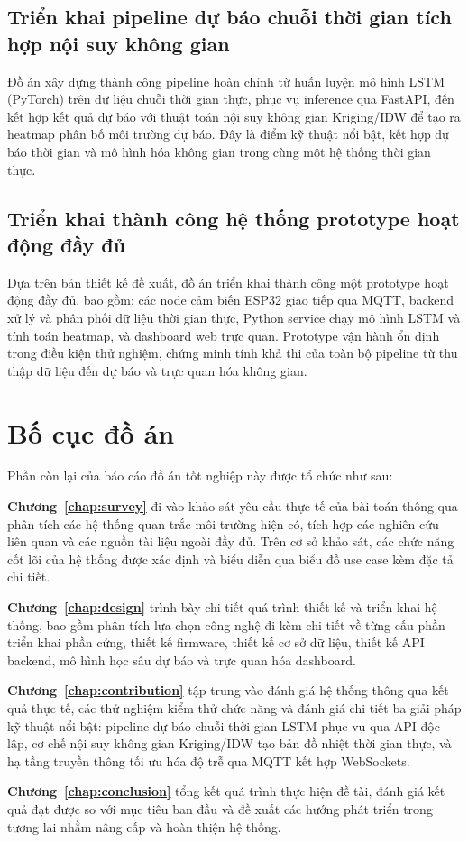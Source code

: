 \subsection{Triển khai pipeline dự báo chuỗi thời gian tích hợp
nội suy không gian}
\label{subsec:intro:contrib2}

Đồ án xây dựng thành công pipeline hoàn chỉnh từ huấn luyện mô hình
LSTM (PyTorch) trên dữ liệu chuỗi thời gian thực, phục vụ inference
qua FastAPI, đến kết hợp kết quả dự báo với thuật toán nội suy không
gian Kriging/IDW để tạo ra heatmap phân bố môi trường dự báo. Đây là
điểm kỹ thuật nổi bật, kết hợp dự báo thời gian và mô hình hóa không
gian trong cùng một hệ thống thời gian thực.

\subsection{Triển khai thành công hệ thống prototype hoạt động đầy đủ}
\label{subsec:intro:contrib3}

Dựa trên bản thiết kế đề xuất, đồ án triển khai thành công một prototype
hoạt động đầy đủ, bao gồm: các node cảm biến ESP32 giao tiếp qua MQTT,
backend xử lý và phân phối dữ liệu thời gian thực, Python service chạy
mô hình LSTM và tính toán heatmap, và dashboard web trực quan. Prototype
vận hành ổn định trong điều kiện thử nghiệm, chứng minh tính khả thi
của toàn bộ pipeline từ thu thập dữ liệu đến dự báo và trực quan hóa
không gian.

\section{Bố cục đồ án}
\label{sec:intro:structure}

Phần còn lại của báo cáo đồ án tốt nghiệp này được tổ chức như sau:

\textbf{Chương~\ref{chap:survey}} đi vào khảo sát yêu cầu thực tế của
bài toán thông qua phân tích các hệ thống quan trắc môi trường hiện có, tích
hợp các nghiên cứu liên quan và các nguồn tài liệu ngoài đầy đủ. Trên cơ sở
khảo sát, các chức năng cốt lõi của hệ thống được xác định và biểu diễn qua
biểu đồ use case kèm đặc tả chi tiết.

\textbf{Chương~\ref{chap:design}} trình bày chi tiết quá trình thiết
kế và triển khai hệ thống, bao gồm phân tích lựa chọn công nghệ đi kèm chi tiết
về từng cấu phần triển khai phần cứng, thiết kế firmware, thiết kế cơ sở dữ
liệu, thiết kế API backend, mô hình học sâu dự báo và trực quan hóa dashboard.

\textbf{Chương~\ref{chap:contribution}} tập trung vào đánh giá hệ thống thông qua kết
quả thực tế, các thử nghiệm kiểm thử chức năng và đánh giá chi tiết ba giải
pháp kỹ thuật nổi bật: pipeline dự báo chuỗi thời gian LSTM phục vụ qua API độc
lập, cơ chế nội suy không gian Kriging/IDW tạo bản đồ nhiệt thời gian thực,
và hạ tầng truyền thông tối ưu hóa độ trễ qua MQTT kết hợp WebSockets.

\textbf{Chương~\ref{chap:conclusion}} tổng kết quá trình thực hiện đề
tài, đánh giá kết quả đạt được so với mục tiêu ban đầu và đề xuất các
hướng phát triển trong tương lai nhằm nâng cấp và hoàn thiện hệ thống.

